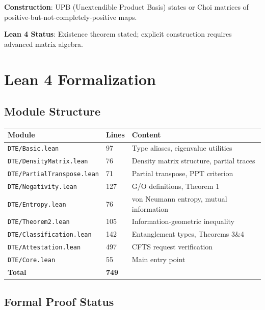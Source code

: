 \documentclass[11pt,a4paper]{article}
\theoremstyle{definition}
\begin{document}
\textbf{Construction}: UPB (Unextendible Product Basis) states or Choi matrices of positive-but-not-completely-positive maps.

\textbf{Lean 4 Status}: Existence theorem stated; explicit construction requires advanced matrix algebra.

\section{Lean 4 Formalization}

\subsection{Module Structure}

\begin{table}[h]
\centering
\begin{tabular}{lll}
\toprule
\textbf{Module} & \textbf{Lines} & \textbf{Content} \\
\midrule
\texttt{DTE/Basic.lean} & 97 & Type aliases, eigenvalue utilities \\
\texttt{DTE/DensityMatrix.lean} & 76 & Density matrix structure, partial traces \\
\texttt{DTE/PartialTranspose.lean} & 71 & Partial transpose, PPT criterion \\
\texttt{DTE/Negativity.lean} & 127 & G/O definitions, Theorem 1 \\
\texttt{DTE/Entropy.lean} & 76 & von Neumann entropy, mutual information \\
\texttt{DTE/Theorem2.lean} & 105 & Information-geometric inequality \\
\texttt{DTE/Classification.lean} & 142 & Entanglement types, Theorems 3\&4 \\
\texttt{DTE/Attestation.lean} & 497 & CFTS request verification \\
\texttt{DTE/Core.lean} & 55 & Main entry point \\
\midrule
\textbf{Total} & \textbf{749} & \\
\bottomrule
\end{tabular}
\end{table}

\subsection{Formal Proof Status}
\end{document}
